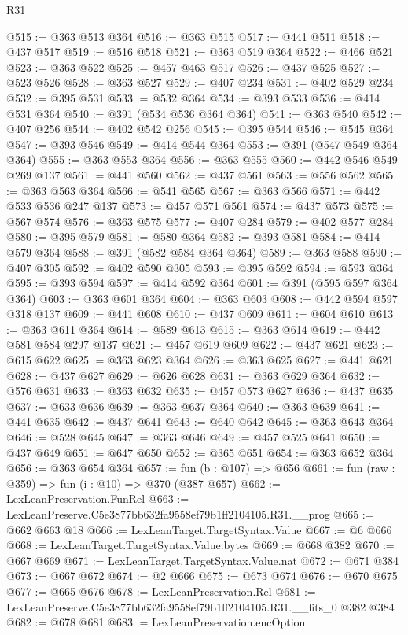 \begin{lexlean}{R31}
\begin{coremodule}
@515 := @363 @513 @364
@516 := @363 @515
@517 := @441 @511
@518 := @437 @517
@519 := @516 @518
@521 := @363 @519 @364
@522 := @466 @521
@523 := @363 @522
@525 := @457 @463 @517
@526 := @437 @525
@527 := @523 @526
@528 := @363 @527
@529 := @407 @234
@531 := @402 @529 @234
@532 := @395 @531
@533 := @532 @364
@534 := @393 @533
@536 := @414 @531 @364
@540 := @391 (@534 @536 @364 @364)
@541 := @363 @540
@542 := @407 @256
@544 := @402 @542 @256
@545 := @395 @544
@546 := @545 @364
@547 := @393 @546
@549 := @414 @544 @364
@553 := @391 (@547 @549 @364 @364)
@555 := @363 @553 @364
@556 := @363 @555
@560 := @442 @546 @549 @269 @137
@561 := @441 @560
@562 := @437 @561
@563 := @556 @562
@565 := @363 @563 @364
@566 := @541 @565
@567 := @363 @566
@571 := @442 @533 @536 @247 @137
@573 := @457 @571 @561
@574 := @437 @573
@575 := @567 @574
@576 := @363 @575
@577 := @407 @284
@579 := @402 @577 @284
@580 := @395 @579
@581 := @580 @364
@582 := @393 @581
@584 := @414 @579 @364
@588 := @391 (@582 @584 @364 @364)
@589 := @363 @588
@590 := @407 @305
@592 := @402 @590 @305
@593 := @395 @592
@594 := @593 @364
@595 := @393 @594
@597 := @414 @592 @364
@601 := @391 (@595 @597 @364 @364)
@603 := @363 @601 @364
@604 := @363 @603
@608 := @442 @594 @597 @318 @137
@609 := @441 @608
@610 := @437 @609
@611 := @604 @610
@613 := @363 @611 @364
@614 := @589 @613
@615 := @363 @614
@619 := @442 @581 @584 @297 @137
@621 := @457 @619 @609
@622 := @437 @621
@623 := @615 @622
@625 := @363 @623 @364
@626 := @363 @625
@627 := @441 @621
@628 := @437 @627
@629 := @626 @628
@631 := @363 @629 @364
@632 := @576 @631
@633 := @363 @632
@635 := @457 @573 @627
@636 := @437 @635
@637 := @633 @636
@639 := @363 @637 @364
@640 := @363 @639
@641 := @441 @635
@642 := @437 @641
@643 := @640 @642
@645 := @363 @643 @364
@646 := @528 @645
@647 := @363 @646
@649 := @457 @525 @641
@650 := @437 @649
@651 := @647 @650
@652 := @365 @651
@654 := @363 @652 @364
@656 := @363 @654 @364
@657 := fun (b : @107) => @656
@661 := fun (raw : @359) => fun (i : @10) => @370 (@387 @657)
@662 := LexLeanPreservation.FunRel
@663 := LexLeanPreserve.C5e3877bb632fa9558ef79b1ff2104105.R31.__prog
@665 := @662 @663 @18
@666 := LexLeanTarget.TargetSyntax.Value
@667 := @6 @666
@668 := LexLeanTarget.TargetSyntax.Value.bytes
@669 := @668 @382
@670 := @667 @669
@671 := LexLeanTarget.TargetSyntax.Value.nat
@672 := @671 @384
@673 := @667 @672
@674 := @2 @666
@675 := @673 @674
@676 := @670 @675
@677 := @665 @676
@678 := LexLeanPreservation.Rel
@681 := LexLeanPreserve.C5e3877bb632fa9558ef79b1ff2104105.R31.__fits_0 @382 @384
@682 := @678 @681
@683 := LexLeanPreservation.encOption

\end{coremodule}
\end{lexlean}
